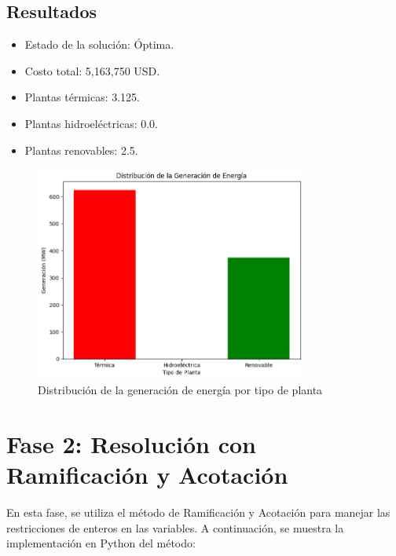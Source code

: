 \documentclass{article}
\begin{document}
\subsection*{Resultados}
\begin{itemize}[noitemsep]
    \item Estado de la solución: Óptima.
    \item Costo total: 5,163,750 USD.
    \item Plantas térmicas: 3.125.
    \item Plantas hidroeléctricas: 0.0.
    \item Plantas renovables: 2.5.
\end{itemize}

\begin{figure}[H]
    \centering
    \includegraphics[width=0.8\textwidth]{simplex.png}
    \caption{Distribución de la generación de energía por tipo de planta}
\end{figure}


\section*{Fase 2: Resolución con Ramificación y Acotación}
En esta fase, se utiliza el método de Ramificación y Acotación para manejar las restricciones de enteros en las variables. A continuación, se muestra la implementación en Python del método:
\end{document}
